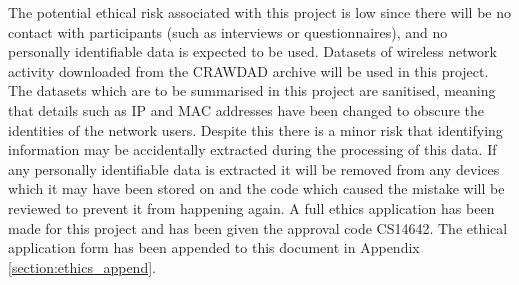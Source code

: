 The potential ethical risk associated with this project is low since there will be no contact with participants (such as interviews or questionnaires), and no personally identifiable data is expected to be used. 
Datasets of wireless network activity downloaded from the CRAWDAD archive will be used in this project. The datasets which are to be summarised in this project are sanitised, meaning that details such as IP and MAC addresses have been changed to obscure the identities of the network users. Despite this there is a minor risk that identifying information may be accidentally extracted during the processing of this data.
If any personally identifiable data is extracted it will be removed from any devices which it may have been stored on and the code which caused the mistake will be reviewed to prevent it from happening again. A full ethics application has been made for this project and has been given the approval code CS14642. The ethical application form has been appended to this document in Appendix \ref{section:ethics_append}.